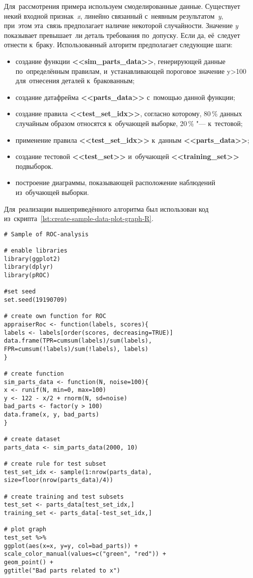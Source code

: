 \documentclass[]{scrreprt}
\begin{document}
Для~рассмотрения примера используем смоделированные данные. Существует некий входной признак~\emph{x}, линейно связанный с~неявным результатом~\emph{y}, при~этом эта~связь предполагает наличие некоторой случайности. Значение \emph{y} показывает превышает~ли деталь требования по~допуску. Если да, её~следует отнести к~браку. Использованный алгоритм предполагает следующие шаги:
\begin{itemize}
	\item создание функции \textbf{<<sim\_parts\_data>>}, генерирующей данные по~определённым правилам, и~устанавливающей пороговое значение y>100 для~отнесения деталей к~бракованным;
	\item создание датафрейма \textbf{<<parts\_data>>} с~помощью данной функции;
	\item создание правила \textbf{<<test\_set\_idx>>}, согласно которому, 80\,\% данных случайным образом относятся к~обучающей выборке, 20\,\% "--- к~тестовой;
	\item применение правила \textbf{<<test\_set\_idx>>} к~данным \textbf{<<parts\_data>>};
	\item создание тестовой \textbf{<<test\_set>>} и~обучающей \textbf{<<training\_set>>} подвыборок.
	\item построение диаграммы, показывающей расположение наблюдений из~обучающей выборки.
\end{itemize}
Для~реализации вышеприведённого алгоритма был использован код из~скрипта~\ref{lst:create-sample-data-plot-graph-R}.
%
\begin{lstlisting}[float, caption = Создание и~первичная визуализация данных о~качественных и~бракованных деталях, firstnumber=1, label= lst:create-sample-data-plot-graph-R]
# Sample of ROC-analysis

# enable libraries
library(ggplot2)
library(dplyr)
library(pROC)

#set seed
set.seed(19190709)

# create own function for ROC
appraiserRoc <- function(labels, scores){
labels <- labels[order(scores, decreasing=TRUE)]
data.frame(TPR=cumsum(labels)/sum(labels),
FPR=cumsum(!labels)/sum(!labels), labels)
}

# create function 
sim_parts_data <- function(N, noise=100){
x <- runif(N, min=0, max=100)
y <- 122 - x/2 + rnorm(N, sd=noise)
bad_parts <- factor(y > 100)
data.frame(x, y, bad_parts)
}

# create dataset
parts_data <- sim_parts_data(2000, 10)

# create rule for test subset
test_set_idx <- sample(1:nrow(parts_data), size=floor(nrow(parts_data)/4))

# create training and test subsets
test_set <- parts_data[test_set_idx,]
training_set <- parts_data[-test_set_idx,]

# plot graph
test_set %>% 
ggplot(aes(x=x, y=y, col=bad_parts)) + 
scale_color_manual(values=c("green", "red")) + 
geom_point() + 
ggtitle("Bad parts related to x")

\end{lstlisting}
%
\end{document}
